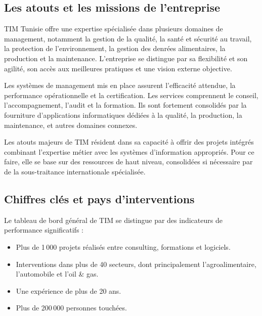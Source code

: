 \subsection{Les atouts et les missions de l'entreprise}

TIM Tunisie offre une expertise spécialisée dans plusieurs domaines de management, notamment la gestion de la qualité, la santé et sécurité au travail, la protection de l'environnement, la gestion des denrées alimentaires, la production et la maintenance. L'entreprise se distingue par sa flexibilité et son agilité, son accès aux meilleures pratiques et une vision externe objective.

Les systèmes de management mis en place assurent l'efficacité attendue, la performance opérationnelle et la certification. Les services comprennent le conseil, l'accompagnement, l'audit et la formation. Ils sont fortement consolidés par la fourniture d'applications informatiques dédiées à la qualité, la production, la maintenance, et autres domaines connexes.

Les atouts majeurs de TIM résident dans sa capacité à offrir des projets intégrés combinant l'expertise métier avec les systèmes d'information appropriés. Pour ce faire, elle se base sur des ressources de haut niveau, consolidées si nécessaire par de la sous-traitance internationale spécialisée.

\subsection{Chiffres clés et pays d'interventions}

Le tableau de bord général de TIM se distingue par des indicateurs de performance significatifs :

\begin{itemize}
    \item Plus de 1\,000 projets réalisés entre consulting, formations et logiciels.
    \item Interventions dans plus de 40 secteurs, dont principalement l'agroalimentaire, l'automobile et l'oil \& gas.
    \item Une expérience de plus de 20 ans.
    \item Plus de 200\,000 personnes touchées.
\end{itemize}


